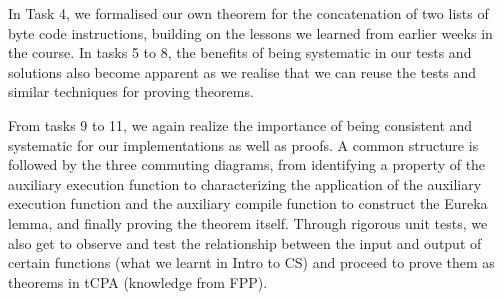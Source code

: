\documentclass{article}
\begin{document}
In Task 4, we formalised our own theorem for the concatenation of two lists of byte code instructions, building on the lessons we learned from earlier weeks in the course. In tasks 5 to 8, the benefits of being systematic in our tests and solutions also become apparent as we realise that we can reuse the tests and similar techniques for proving theorems. 

From tasks 9 to 11, we again realize the importance of being consistent and systematic for our implementations as well as proofs. A common structure is followed by the three commuting diagrams, from identifying a property of the auxiliary execution function to characterizing the application of the auxiliary execution function and the auxiliary compile function to construct the Eureka lemma, and finally proving the theorem itself. Through rigorous unit tests, we also get to observe and test the relationship between the input and output of certain functions (what we learnt in Intro to CS) and proceed to prove them as theorems in tCPA (knowledge from FPP).
\end{document}
